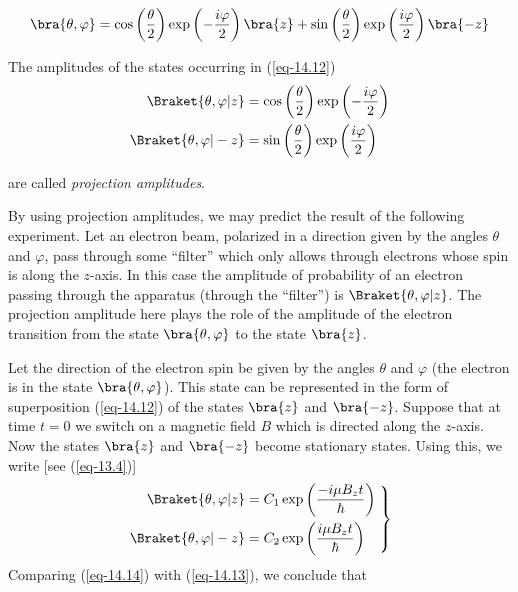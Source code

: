 \documentclass[a4paper,sfsidenotes,colorlinks=true]{tufte-book}
\numberwithin{equation}{section}
\numberwithin{figure}{section}
\begin{document}
\begin{equation}%
\bra{\theta, \varphi}  = \cos \left( \frac{\theta}{2} \right) \exp
\left( - \frac{ i \varphi}{2} \right) \bra{z} + \sin \left( \frac{\theta}{2} \right) \exp
\left( \frac{ i \varphi}{2} \right) \bra{- z}  
\label{eq-14.12}
\end{equation}

The amplitudes of the states occurring in (\ref{eq-14.12})
\begin{equation}%
\begin{split}
\Braket{\theta , \varphi | z} & = \cos \left( \frac{\theta}{2} \right) \exp
\left( - \frac{ i \varphi}{2} \right) \\
\Braket{\theta , \varphi | -z} & = \sin \left( \frac{\theta}{2} \right) \exp
\left( \frac{ i \varphi}{2}  \right)
\end{split}
\label{eq-14.13}
\end{equation}

are called \emph{projection amplitudes}. 

By using projection amplitudes, we may predict the result of the
following experiment. Let an electron beam, polarized in a direction
given by the angles $\theta$ and $\varphi$, pass through some
``filter'' which only allows through electrons whose spin is along the
$z$-axis. In this case the amplitude of probability of an electron
passing through the apparatus (through the ``filter'') is
$\Braket{\theta, \varphi | z}$. The projection amplitude here plays
the role of the amplitude of the electron transition from the state
$\bra{\theta, \varphi}$ to the state $\bra{z}$.


Let the direction of the
electron spin be given by the angles $\theta$ and $\varphi$ (the
electron is in the state $\bra{\theta, \varphi}$). This state can be
represented in the form of superposition (\ref{eq-14.12}) of the
states $\bra{z}$ and $\bra{-z}$. Suppose that at time $t = 0$ we
switch on a magnetic field $B$ which is directed along the
$z$-axis. Now the states $\bra{z}$ and $\bra{-z}$ become stationary
states. Using this, we write [see (\ref{eq-13.4})]
\begin{equation}%
\left.
\begin{split}
\Braket{\theta, \varphi | z}  & = C_{1} \exp \left( \frac{-i \mu B_{z} t}{\hbar} \right) \\   
\Braket{\theta, \varphi | - z}  & = C_{2} \exp \left( \frac{i \mu B_{z} t}{\hbar} \right) 
\end{split}
\; \right\}
\label{eq-14.14}
\end{equation}
Comparing (\ref{eq-14.14}) with (\ref{eq-14.13}), we conclude that
\end{document}
